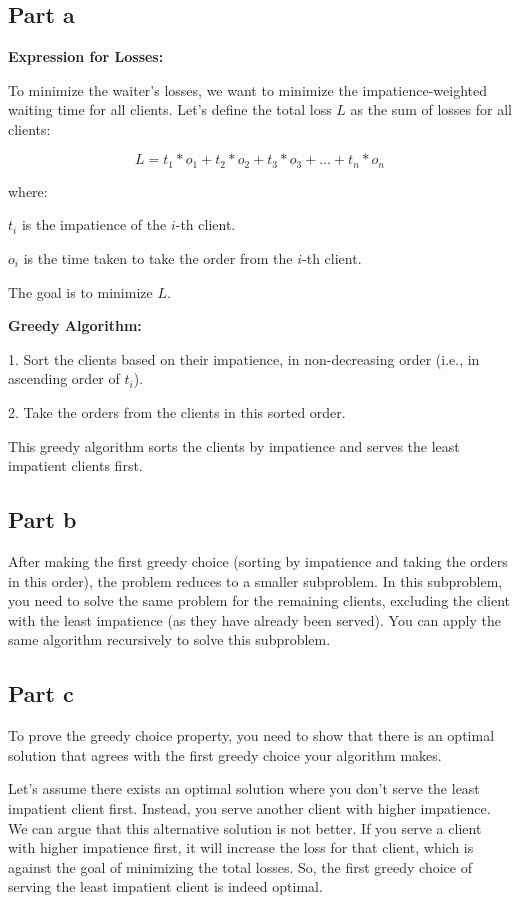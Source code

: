 \section{}
\subsection*{Part a}
\textbf{Expression for Losses:}

To minimize the waiter's losses, we want to minimize the impatience-weighted waiting time for all clients. Let's define the total loss $L$ as the sum of losses for all clients:

\[L = t_1 * o_1 + t_2 * o_2 + t_3 * o_3 + \dots + t_n * o_n\]

where:

$t_i$ is the impatience of the $i$-th client.

$o_i$ is the time taken to take the order from the $i$-th client.

The goal is to minimize $L$.

\textbf{Greedy Algorithm:}

1. Sort the clients based on their impatience, in non-decreasing order (i.e., in ascending order of $t_i$).

2. Take the orders from the clients in this sorted order.

This greedy algorithm sorts the clients by impatience and serves the least impatient clients first.

\subsection*{Part b}
After making the first greedy choice (sorting by impatience and taking the orders in this order), the problem reduces to a smaller subproblem. In this subproblem, you need to solve the same problem for the remaining clients, excluding the client with the least impatience (as they have already been served). You can apply the same algorithm recursively to solve this subproblem.

\subsection*{Part c}
To prove the greedy choice property, you need to show that there is an optimal solution that agrees with the first greedy choice your algorithm makes.

Let's assume there exists an optimal solution where you don't serve the least impatient client first. Instead, you serve another client with higher impatience. We can argue that this alternative solution is not better. If you serve a client with higher impatience first, it will increase the loss for that client, which is against the goal of minimizing the total losses. So, the first greedy choice of serving the least impatient client is indeed optimal.

